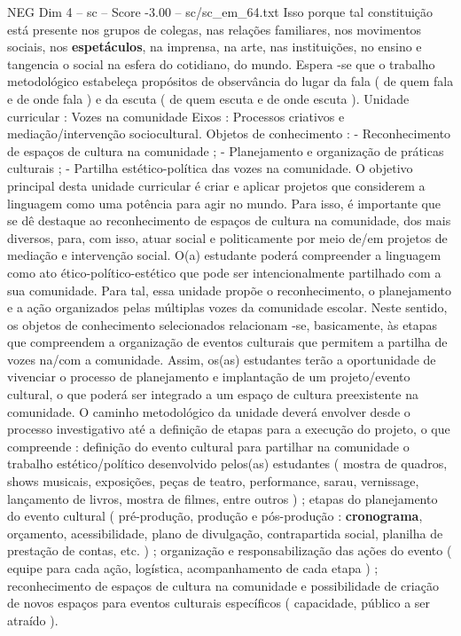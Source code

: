 \begin{textsample}{NEG Dim 4 – sc – Score -3.00 – sc/sc\_em\_64.txt}
Isso porque tal constituição está presente nos grupos de colegas, nas relações familiares, nos movimentos sociais, nos \textbf{espetáculos}, na imprensa, na arte, nas instituições, no ensino e tangencia o social na esfera do cotidiano, do mundo.
Espera -se que o trabalho metodológico estabeleça propósitos de observância do lugar da fala ( de quem fala e de onde fala ) e da escuta ( de quem escuta e de onde escuta ).
Unidade curricular : Vozes na comunidade Eixos : Processos criativos e mediação/intervenção sociocultural.
Objetos de conhecimento : - Reconhecimento de espaços de cultura na comunidade ; - Planejamento e organização de práticas culturais ; - Partilha estético-política das vozes na comunidade.
O objetivo principal desta unidade curricular é criar e aplicar projetos que considerem a linguagem como uma potência para agir no mundo.
Para isso, é importante que se dê destaque ao reconhecimento de espaços de cultura na comunidade, dos mais diversos, para, com isso, atuar social e politicamente por meio de/em projetos de mediação e intervenção social.
O(a) estudante poderá compreender a linguagem como ato ético-político-estético que pode ser intencionalmente partilhado com a sua comunidade.
Para tal, essa unidade propõe o reconhecimento, o planejamento e a ação organizados pelas múltiplas vozes da comunidade escolar.
Neste sentido, os objetos de conhecimento selecionados relacionam -se, basicamente, às etapas que compreendem a organização de eventos culturais que permitem a partilha de vozes na/com a comunidade.
Assim, os(as) estudantes terão a oportunidade de vivenciar o processo de planejamento e implantação de um projeto/evento cultural, o que poderá ser integrado a um espaço de cultura preexistente na comunidade.
O caminho metodológico da unidade deverá envolver desde o processo investigativo até a definição de etapas para a execução do projeto, o que compreende : definição do evento cultural para partilhar na comunidade o trabalho estético/político desenvolvido pelos(as) estudantes ( mostra de quadros, shows musicais, exposições, peças de teatro, performance, sarau, vernissage, lançamento de livros, mostra de filmes, entre outros ) ; etapas do planejamento do evento cultural ( pré-produção, produção e pós-produção : \textbf{cronograma}, orçamento, acessibilidade, plano de divulgação, contrapartida social, planilha de prestação de contas, etc. ) ; organização e responsabilização das ações do evento ( equipe para cada ação, logística, acompanhamento de cada etapa ) ; reconhecimento de espaços de cultura na comunidade e possibilidade de criação de novos espaços para eventos culturais específicos ( capacidade, público a ser atraído ).

\end{textsample}
